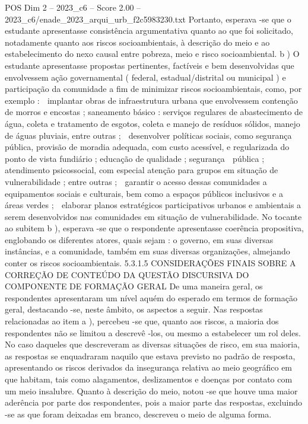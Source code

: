 \begin{textsample}{POS Dim 2 – 2023\_c6 – Score 2.00 – 2023\_c6/enade\_2023\_arqui\_urb\_f2c5983230.txt}
Portanto, esperava -se que o estudante apresentasse consistência argumentativa quanto ao que foi solicitado, notadamente quanto aos riscos socioambientais, à descrição do meio e ao estabelecimento do nexo causal entre pobreza, meio e risco socioambiental. b ) O estudante apresentasse propostas pertinentes, factíveis e bem desenvolvidas que envolvessem ação governamental ( federal, estadual/distrital ou municipal ) e participação da comunidade a fim de minimizar riscos socioambientais, como, por exemplo :  implantar obras de infraestrutura urbana que envolvessem contenção de morros e encostas ; saneamento básico : serviços regulares de abastecimento de água, coleta e tratamento de esgotos, coleta e manejo de resíduos sólidos, manejo de águas pluviais, entre outras ;  desenvolver políticas sociais, como segurança pública, provisão de moradia adequada, com custo acessível, e regularizada do ponto de vista fundiário ; educação de qualidade ; segurança  pública ; atendimento psicossocial, com especial atenção para grupos em situação de vulnerabilidade ; entre outras ;  garantir o acesso dessas comunidades a equipamentos sociais e culturais, bem como a espaços públicos inclusivos e a áreas verdes ;  elaborar planos estratégicos participativos urbanos e ambientais a serem desenvolvidos nas comunidades em situação de vulnerabilidade.
No tocante ao subitem b ), esperava -se que o respondente apresentasse coerência propositiva, englobando os diferentes atores, quais sejam : o governo, em suas diversas instâncias, e a comunidade, também em suas diversas organizações, almejando conter os riscos socioambientais. 5.3.1.5 CONSIDERAÇÕES FINAIS SOBRE A CORREÇÃO DE CONTEÚDO DA QUESTÃO DISCURSIVA DO COMPONENTE DE FORMAÇÃO GERAL De uma maneira geral, os respondentes apresentaram um nível aquém do esperado em termos de formação geral, destacando -se, neste âmbito, os aspectos a seguir.
Nas respostas relacionadas ao item a ), percebeu -se que, quanto aos riscos, a maioria dos respondentes não se limitou a descrevê -los, ou mesmo a estabelecer um rol deles.
No caso daqueles que descreveram as diversas situações de risco, em sua maioria, as respostas se enquadraram naquilo que estava previsto no padrão de resposta, apresentando os riscos derivados da insegurança relativa ao meio geográfico em que habitam, tais como alagamentos, deslizamentos e doenças por contato com um meio insalubre.
Quanto à descrição do meio, notou -se que houve uma maior aderência por parte dos respondentes, pois a maior parte das respostas, excluindo -se as que foram deixadas em branco, descreveu o meio de alguma forma.

\end{textsample}
